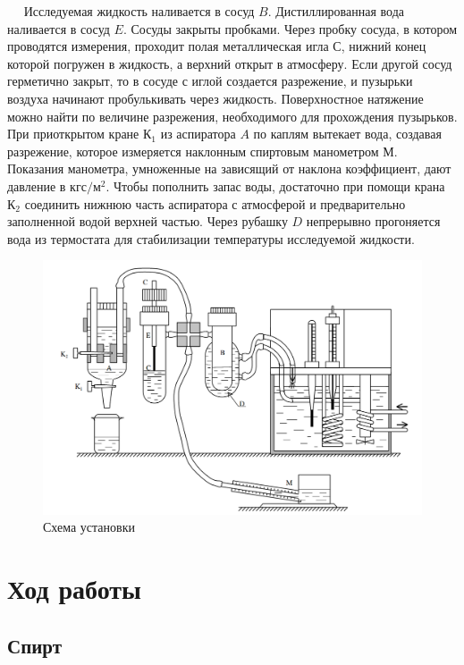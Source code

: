 \documentclass[12pt,a4paper]{article}
\begin{document}
	$\quad$  Исследуемая жидкость наливается в сосуд $B$. Дистиллированная вода наливается в сосуд $E$. Сосуды закрыты пробками. Через пробку сосуда, в котором проводятся измерения, проходит полая металлическая игла $С$, нижний конец которой погружен в жидкость, а верхний открыт в атмосферу. Если другой сосуд герметично закрыт, то в сосуде с иглой создается разрежение, и пузырьки воздуха начинают пробулькивать через жидкость. Поверхностное натяжение можно найти по величине разрежения, необходимого для прохождения пузырьков. При приоткрытом кране $\text{К}_1$ из аспиратора $A$ по каплям вытекает вода, создавая разрежение, которое измеряется наклонным спиртовым манометром $М$. Показания манометра, умноженные на зависящий от наклона коэффициент, дают давление в $\text{кгс}/\text{м}^2$. Чтобы пополнить запас воды, достаточно при помощи крана $\text{К}_2$ соединить нижнюю часть аспиратора с атмосферой и предварительно заполненной водой верхней частью. Через рубашку $D$ непрерывно прогоняется вода из термостата для стабилизации температуры исследуемой жидкости.
	
	
	\begin{figure}[h]
		\begin{center}
			\includegraphics[width=0.9\linewidth]{res/scheme.png}
		\end{center}
		\caption{Схема установки}
		\label{scheme}
	\end{figure}	
	
	
	\section*{Ход работы}
	
	\subsection*{Спирт}
	
\end{document}
